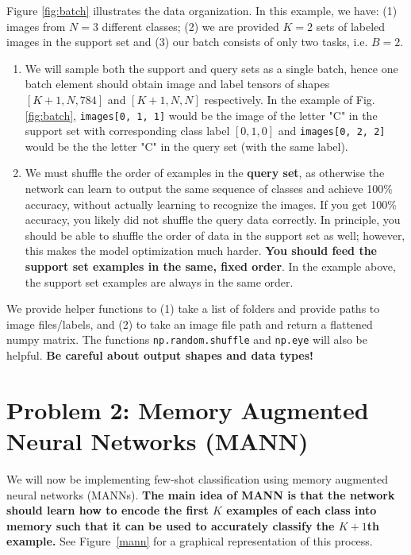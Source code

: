 \documentclass[12pt]{article}
\begin{document}
Figure \ref{fig:batch} illustrates the data organization. In this example, we have: (1) images from $N=3$ different classes; (2) we are provided $K=2$ sets of labeled images in the support set and (3) our batch consists of only two tasks, i.e. $B=2$. 
\begin{enumerate}
    \item We will sample both the support and query sets as a single batch, hence one batch element should obtain image and label tensors of shapes $[K+1, N, 784]$  and $[K+1, N, N]$ respectively. In the example of Fig. \ref{fig:batch}, \texttt{images[0, 1, 1]} would be the image of the letter "C" in the support set with corresponding class label $[0, 1, 0]$ and \texttt{images[0, 2, 2]} would be the the letter "C" in the query set (with the same label).

    \item We must shuffle the order of examples in the \textbf{query set}, as otherwise the network can learn to output the same sequence of classes and achieve 100\% accuracy, without actually learning to recognize the images. If you get 100\% accuracy, you likely did not shuffle the query data correctly. In principle, you should be able to shuffle the order of data in the support set as well; however, this makes the model optimization much harder. \textbf{You should feed the support set examples in the same, fixed order}. In the example above, the support set examples are always in the same order.

\end{enumerate}

\noindent We provide helper functions to (1) take a list of folders and provide paths to image files/labels, and (2) to take an image file path and return a flattened numpy matrix. The functions \texttt{np.random.shuffle} and \texttt{np.eye} will also be helpful. \textbf{Be careful about output shapes and data types!}




\section*{Problem 2: Memory Augmented Neural Networks (MANN)     \cite{pmlr-v48-santoro16,DBLP:journals/corr/MishraRCA17}}

We will now be implementing few-shot classification using memory augmented neural networks (MANNs). \textbf{The main idea of MANN is that the network should learn how to encode the first $K$ examples of each class into memory such that it can be used to accurately classify the $K+1$th example.} See Figure~\ref{mann} for a graphical representation of this process.
\end{document}

